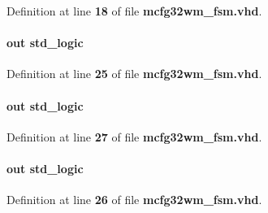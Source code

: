 Definition at line {\bf 18} of file {\bf mcfg32wm\+\_\+fsm.\+vhd}.

\paragraph[{din\+\_\+reg\+\_\+en}]{ {\bfseries \textcolor{keywordflow}{out}\textcolor{vhdlchar}{ }} {\bfseries \textcolor{comment}{std\+\_\+logic}\textcolor{vhdlchar}{ }} \hspace{0.3cm}{\ttfamily [Port]}}\label{classmcfg32wm__fsm_a39654268637e6c00ef8e84e72ae1e2a9}


Definition at line {\bf 25} of file {\bf mcfg32wm\+\_\+fsm.\+vhd}.

\paragraph[{dout\+\_\+reg\+\_\+len}]{ {\bfseries \textcolor{keywordflow}{out}\textcolor{vhdlchar}{ }} {\bfseries \textcolor{comment}{std\+\_\+logic}\textcolor{vhdlchar}{ }} \hspace{0.3cm}{\ttfamily [Port]}}\label{classmcfg32wm__fsm_a006257df1dacbf004e9057a27464306e}


Definition at line {\bf 27} of file {\bf mcfg32wm\+\_\+fsm.\+vhd}.

\paragraph[{dout\+\_\+reg\+\_\+sen}]{ {\bfseries \textcolor{keywordflow}{out}\textcolor{vhdlchar}{ }} {\bfseries \textcolor{comment}{std\+\_\+logic}\textcolor{vhdlchar}{ }} \hspace{0.3cm}{\ttfamily [Port]}}\label{classmcfg32wm__fsm_a72883610215384a665040f255f7ba1d0}


Definition at line {\bf 26} of file {\bf mcfg32wm\+\_\+fsm.\+vhd}.

